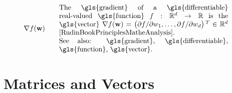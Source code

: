 \begin{align}
	 &\nabla f(\weights) & \quad & \parbox{.70\textwidth}{The \gls{gradient} of a \gls{differentiable} real-valued \gls{function} 
	 	$f: \mathbb{R}^{\featuredim}\rightarrow \mathbb{R}$ is the \gls{vector} 
	 	$\nabla f(\weights) = \big( {\partial f}/{\partial \weight_{1}}, \ldots, {\partial f}/{\partial \weight_{\featuredim}}  \big)\,^{T} \in \mathbb{R}^{\featuredim}$ 
		\cite[Ch. 9]{RudinBookPrinciplesMatheAnalysis}.
		\\ See also: \gls{gradient}, \gls{differentiable}, \gls{function}, \gls{vector}.}   \nonumber
\end{align} 
\section*{Matrices and Vectors} 


